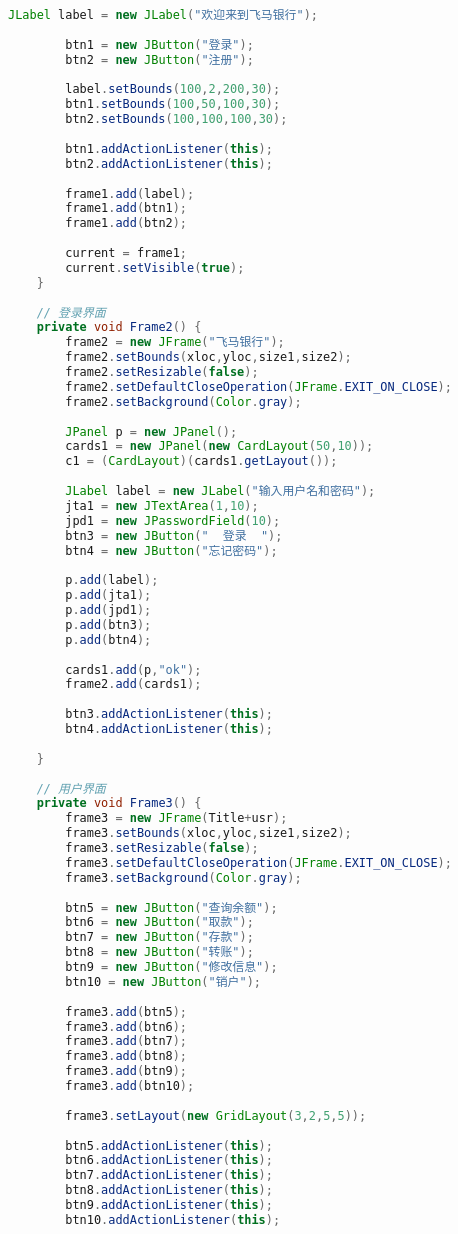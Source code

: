 \begin{lstlisting}[language = java, caption = UI.java]
		JLabel label = new JLabel("欢迎来到飞马银行");
		
		btn1 = new JButton("登录");
		btn2 = new JButton("注册");
		
		label.setBounds(100,2,200,30);
		btn1.setBounds(100,50,100,30);
		btn2.setBounds(100,100,100,30);
		
		btn1.addActionListener(this);
		btn2.addActionListener(this);
		
		frame1.add(label);
		frame1.add(btn1);
		frame1.add(btn2);
		
		current = frame1;
		current.setVisible(true);
	}
	
	// 登录界面
	private void Frame2() {
		frame2 = new JFrame("飞马银行");
		frame2.setBounds(xloc,yloc,size1,size2);
		frame2.setResizable(false);
		frame2.setDefaultCloseOperation(JFrame.EXIT_ON_CLOSE);
		frame2.setBackground(Color.gray);
		
		JPanel p = new JPanel();
		cards1 = new JPanel(new CardLayout(50,10));
		c1 = (CardLayout)(cards1.getLayout());
		
		JLabel label = new JLabel("输入用户名和密码");
		jta1 = new JTextArea(1,10);
		jpd1 = new JPasswordField(10);
		btn3 = new JButton("  登录  ");
		btn4 = new JButton("忘记密码");
		
		p.add(label);
		p.add(jta1);
		p.add(jpd1);
		p.add(btn3);
		p.add(btn4);
		
		cards1.add(p,"ok");
		frame2.add(cards1);
		
		btn3.addActionListener(this);
		btn4.addActionListener(this);
		
	}
	
	// 用户界面
	private void Frame3() {
		frame3 = new JFrame(Title+usr);
		frame3.setBounds(xloc,yloc,size1,size2);
		frame3.setResizable(false);
		frame3.setDefaultCloseOperation(JFrame.EXIT_ON_CLOSE);
		frame3.setBackground(Color.gray);
		
		btn5 = new JButton("查询余额");
		btn6 = new JButton("取款");
		btn7 = new JButton("存款");
		btn8 = new JButton("转账");
		btn9 = new JButton("修改信息");
		btn10 = new JButton("销户");
		
		frame3.add(btn5);
		frame3.add(btn6);
		frame3.add(btn7);
		frame3.add(btn8);
		frame3.add(btn9);
		frame3.add(btn10);
		
		frame3.setLayout(new GridLayout(3,2,5,5));
		
		btn5.addActionListener(this);
		btn6.addActionListener(this);
		btn7.addActionListener(this);
		btn8.addActionListener(this);
		btn9.addActionListener(this);
		btn10.addActionListener(this);
		

\end{lstlisting}
